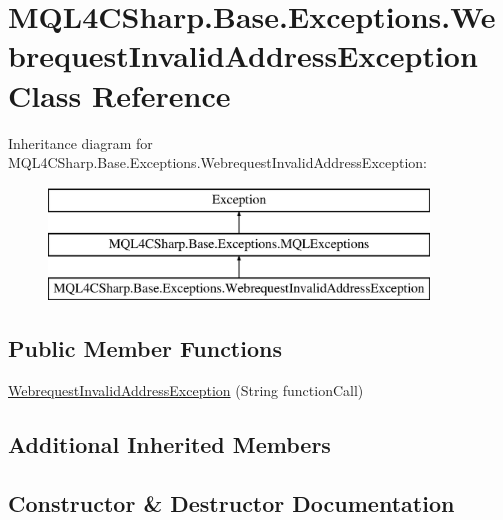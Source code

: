 \hypertarget{class_m_q_l4_c_sharp_1_1_base_1_1_exceptions_1_1_webrequest_invalid_address_exception}{}\section{M\+Q\+L4\+C\+Sharp.\+Base.\+Exceptions.\+Webrequest\+Invalid\+Address\+Exception Class Reference}
\label{class_m_q_l4_c_sharp_1_1_base_1_1_exceptions_1_1_webrequest_invalid_address_exception}
Inheritance diagram for M\+Q\+L4\+C\+Sharp.\+Base.\+Exceptions.\+Webrequest\+Invalid\+Address\+Exception\+:\begin{figure}[H]
\begin{center}
\leavevmode
\includegraphics[height=3.000000cm]{class_m_q_l4_c_sharp_1_1_base_1_1_exceptions_1_1_webrequest_invalid_address_exception}
\end{center}
\end{figure}
\subsection*{Public Member Functions}
\begin{DoxyCompactItemize}
\item 
\hyperlink{class_m_q_l4_c_sharp_1_1_base_1_1_exceptions_1_1_webrequest_invalid_address_exception_acbc4497ce6a7a78d31d61ddb2059fa40}{Webrequest\+Invalid\+Address\+Exception} (String function\+Call)
\end{DoxyCompactItemize}
\subsection*{Additional Inherited Members}


\subsection{Constructor \& Destructor Documentation}
